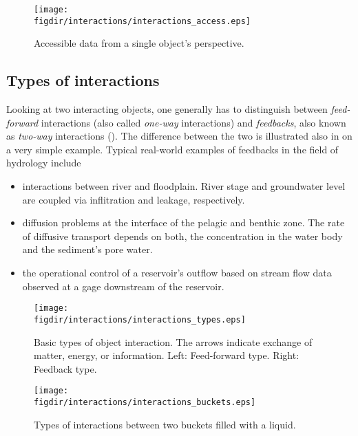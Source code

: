 \begin{figure}
  \centering
  \texttt{[image: \\figdir/interactions/interactions\_access.eps]}
  \caption{Accessible data from a single object's perspective. \label{fig:concept-interactions-access}}
\end{figure}

\subsection{Types of interactions} \label{sec:concept-interactions-types}

Looking at two interacting objects, one generally has to distinguish between \emph{feed-forward} interactions (also called \emph{one-way} interactions) and \emph{feedbacks}, also known as \emph{two-way} interactions (). The difference between the two is illustrated also in  on a very simple example. Typical real-world examples of feedbacks in the field of hydrology include
\begin{itemize}
  \item interactions between river and floodplain. River stage and groundwater level are coupled via inflitration and leakage, respectively.
  \item diffusion problems at the interface of the pelagic and benthic zone. The rate of diffusive transport depends on both, the concentration in the water body and the sediment's pore water.
  \item the operational control of a reservoir's outflow based on stream flow data observed at a gage downstream of the reservoir.
\end{itemize}

\begin{figure}
  \centering
  \texttt{[image: \\figdir/interactions/interactions\_types.eps]}
  \caption[Basic types of object interaction.]{Basic types of object interaction. The arrows indicate exchange of matter, energy, or information. Left: Feed-forward type. Right: Feedback type. \label{fig:concept-interactions-types}}
\end{figure}

\begin{figure}
  \centering
  \texttt{[image: \\figdir/interactions/interactions\_buckets.eps]}
  \caption{Types of interactions between two buckets filled with a liquid. \label{fig:concept-interactions-bucketExample}}
\end{figure}

